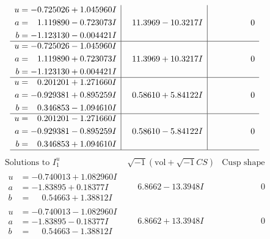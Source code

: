 \documentclass[1p]{elsarticle_modified}
\theoremstyle{definition}
\newcommand{\I}{\sqrt{-1}}
\begin{document}
$$\begin{array}{c|c|c}
\begin{aligned}
u &= -0.725026 + 1.045960 I \\
a &= \phantom{-}1.119890 - 0.723073 I \\
b &= -1.123130 - 0.004421 I\end{aligned}
 & \phantom{-}11.3969 - 10.3217 I & \phantom{-0.000000 } 0 \\ \hline\begin{aligned}
u &= -0.725026 - 1.045960 I \\
a &= \phantom{-}1.119890 + 0.723073 I \\
b &= -1.123130 + 0.004421 I\end{aligned}
 & \phantom{-}11.3969 + 10.3217 I & \phantom{-0.000000 } 0 \\ \hline\begin{aligned}
u &= \phantom{-}0.201201 + 1.271660 I \\
a &= -0.929381 + 0.895259 I \\
b &= \phantom{-}0.346853 - 1.094610 I\end{aligned}
 & \phantom{-}0.58610 + 5.84122 I & \phantom{-0.000000 } 0 \\ \hline\begin{aligned}
u &= \phantom{-}0.201201 - 1.271660 I \\
a &= -0.929381 - 0.895259 I \\
b &= \phantom{-}0.346853 + 1.094610 I\end{aligned}
 & \phantom{-}0.58610 - 5.84122 I & \phantom{-0.000000 } 0\\
 \hline 
 \end{array}$$\newpage$$\begin{array}{c|c|c}  
\text{Solutions to }I^u_{1}& \I (\text{vol} + \sqrt{-1}CS) & \text{Cusp shape}\\
 \hline 
\begin{aligned}
u &= -0.740013 + 1.082960 I \\
a &= -1.83895 + 0.18377 I \\
b &= \phantom{-}0.54663 + 1.38812 I\end{aligned}
 & \phantom{-}6.8662 - 13.3948 I & \phantom{-0.000000 } 0 \\ \hline\begin{aligned}
u &= -0.740013 - 1.082960 I \\
a &= -1.83895 - 0.18377 I \\
b &= \phantom{-}0.54663 - 1.38812 I\end{aligned}
 & \phantom{-}6.8662 + 13.3948 I & \phantom{-0.000000 } 0 \\ \hline\begin{aligned}

\end{aligned}
\end{array}$$
\end{document}
